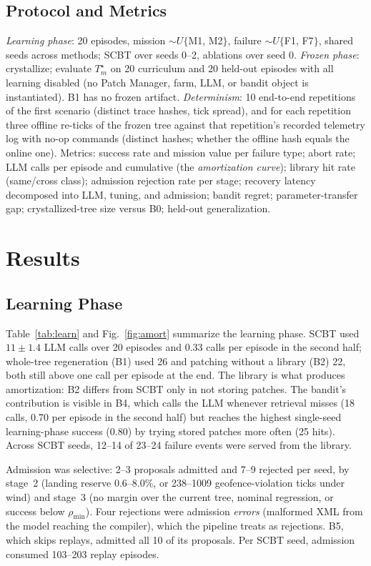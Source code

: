 \documentclass[conference]{IEEEtran}
\begin{document}
\subsection{Protocol and Metrics}
\emph{Learning phase}: 20 episodes, mission $\sim U\{$M1, M2$\}$, failure $\sim U\{$F1, F7$\}$, shared seeds across methods; SCBT over seeds 0--2, ablations over seed 0. \emph{Frozen phase}: crystallize; evaluate $T^\star_m$ on 20 curriculum and 20 held-out episodes with all learning disabled (no Patch Manager, farm, LLM, or bandit object is instantiated). B1 has no frozen artifact. \emph{Determinism}: 10 end-to-end repetitions of the first scenario (distinct trace hashes, tick spread), and for each repetition three offline re-ticks of the frozen tree against that repetition's recorded telemetry log with no-op commands (distinct hashes; whether the offline hash equals the online one). Metrics: success rate and mission value per failure type; abort rate; LLM calls per episode and cumulative (the \emph{amortization curve}); library hit rate (same/cross class); admission rejection rate per stage; recovery latency decomposed into LLM, tuning, and admission; bandit regret; parameter-transfer gap; crystallized-tree size versus B0; held-out generalization.

\section{Results}
\label{sec:results}

\subsection{Learning Phase}
Table~\ref{tab:learn} and Fig.~\ref{fig:amort} summarize the learning phase. SCBT used $11\pm1.4$ LLM calls over 20 episodes and 0.33 calls per episode in the second half; whole-tree regeneration (B1) used 26 and patching without a library (B2) 22, both still above one call per episode at the end. The library is what produces amortization: B2 differs from SCBT only in not storing patches. The bandit's contribution is visible in B4, which calls the LLM whenever retrieval misses (18 calls, 0.70 per episode in the second half) but reaches the highest single-seed learning-phase success (0.80) by trying stored patches more often (25 hits). Across SCBT seeds, 12--14 of 23--24 failure events were served from the library.

Admission was selective: 2--3 proposals admitted and 7--9 rejected per seed, by stage~2 (landing reserve 0.6--8.0\%, or 238--1009 geofence-violation ticks under wind) and stage~3 (no margin over the current tree, nominal regression, or success below $\rho_{\min}$). Four rejections were admission \emph{errors} (malformed XML from the model reaching the compiler), which the pipeline treats as rejections. B5, which skips replays, admitted all 10 of its proposals. Per SCBT seed, admission consumed 103--203 replay episodes.
\end{document}

